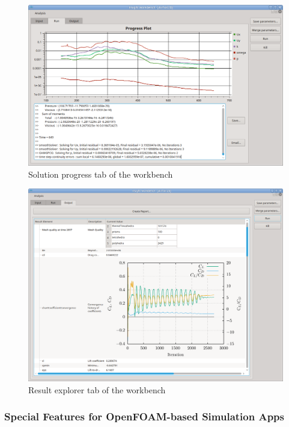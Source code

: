 \begin{figure}[tb]
\centering
\includegraphics[width=\linewidth]{figs/workbench/workbench_airfoil_run}
\caption{Solution progress tab of the workbench}
\label{fig:workbench_progress}
\end{figure}

\begin{figure}[tb]
\centering
\includegraphics[width=\linewidth]{figs/workbench/workbench_airfoil_result}
\caption{Result explorer tab of the workbench}
\label{fig:workbench_result}
\end{figure}

\subsubsection{Special Features for OpenFOAM-based Simulation Apps}

